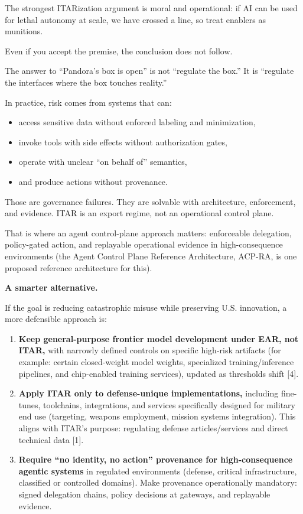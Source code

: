 \documentclass[11pt]{article}
\begin{document}
The strongest ITARization argument is moral and operational: if AI can
be used for lethal autonomy at scale, we have crossed a line, so treat
enablers as munitions.

Even if you accept the premise, the conclusion does not follow.

The answer to ``Pandora's box is open'' is not ``regulate the box.'' It
is ``regulate the interfaces where the box touches reality.''

In practice, risk comes from systems that can:

\begin{itemize}
\tightlist
\item
  access sensitive data without enforced labeling and minimization,
\item
  invoke tools with side effects without authorization gates,
\item
  operate with unclear ``on behalf of'' semantics,
\item
  and produce actions without provenance.
\end{itemize}

Those are governance failures. They are solvable with architecture,
enforcement, and evidence. ITAR is an export regime, not an operational
control plane.

That is where an agent control-plane approach matters: enforceable
delegation, policy-gated action, and replayable operational evidence in
high-consequence environments (the Agent Control Plane Reference
Architecture, ACP-RA, is one proposed reference architecture for this).

\textbf{A smarter alternative.}

If the goal is reducing catastrophic misuse while preserving U.S.
innovation, a more defensible approach is:

\begin{enumerate}
\def\labelenumi{\arabic{enumi}.}
\tightlist
\item
  \textbf{Keep general-purpose frontier model development under EAR, not
  ITAR,} with narrowly defined controls on specific high-risk artifacts
  (for example: certain closed-weight model weights, specialized
  training/inference pipelines, and chip-enabled training services),
  updated as thresholds shift {[}4{]}.
\item
  \textbf{Apply ITAR only to defense-unique implementations,} including
  fine-tunes, toolchains, integrations, and services specifically
  designed for military end use (targeting, weapons employment, mission
  systems integration). This aligns with ITAR's purpose: regulating
  defense articles/services and direct technical data {[}1{]}.
\item
  \textbf{Require ``no identity, no action'' provenance for
  high-consequence agentic systems} in regulated environments (defense,
  critical infrastructure, classified or controlled domains). Make
  provenance operationally mandatory: signed delegation chains, policy
  decisions at gateways, and replayable evidence.
\end{enumerate}
\end{document}
